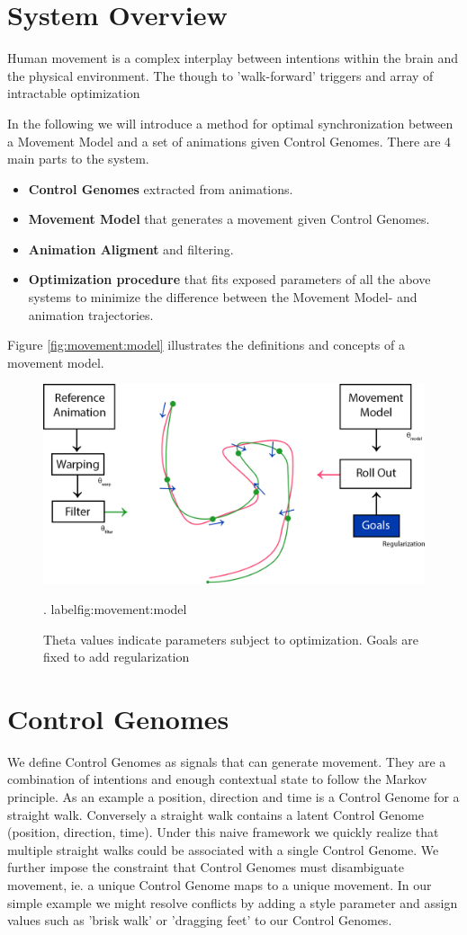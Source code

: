 \section{System Overview}
Human movement is a complex interplay between intentions within the brain and the physical environment. The though to 'walk-forward' triggers and array of intractable optimization  

In the following we will introduce a method for optimal synchronization between a Movement Model and a set of animations given Control Genomes. There are 4 main parts to the system. 
\begin{itemize}
    \item \textbf{Control Genomes} extracted from animations.
    \item \textbf{Movement Model} that generates a movement given Control Genomes.
    \item \textbf{Animation Aligment} and filtering. 
    \item \textbf{Optimization procedure} that fits exposed parameters of all the above systems to minimize the difference between the Movement Model- and animation trajectories.
\end{itemize}
Figure \ref{fig:movement:model} illustrates the definitions and concepts of a movement model.
\begin{figure}
    \centering
    \includegraphics[width=0.75\columnwidth]{img/method-overview.png}
    \caption{Theta values indicate parameters subject to optimization. Goals are fixed to add regularization}.
    label{fig:movement:model}
\end{figure}

\section{Control Genomes}
We define Control Genomes as signals that can generate movement. They are a combination of intentions and enough contextual state to follow the Markov principle. As an example a position, direction and time is a Control Genome for a straight walk. Conversely a straight walk contains a latent Control Genome (position, direction, time). Under this naive framework we quickly realize that multiple straight walks could be associated with a single Control Genome. We further impose the constraint that Control Genomes must disambiguate movement, ie. a unique Control Genome maps to a unique movement. In our simple example we might resolve conflicts by adding a style parameter and assign values such as 'brisk walk' or 'dragging feet' to our Control Genomes. 

